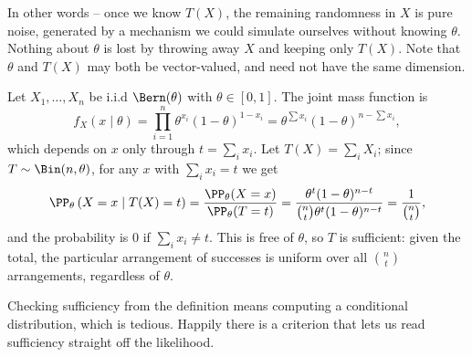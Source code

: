In other words -- once we know $T(X)$, the remaining randomness in $X$ is pure noise, generated by a mechanism we could simulate ourselves without knowing $\theta$. Nothing about $\theta$ is lost by throwing away $X$ and keeping only $T(X)$. Note that $\theta$ and $T(X)$ may both be vector-valued, and need not have the same dimension.

\begin{example}
  Let $X_1, \dots, X_n$ be i.i.d $\Bern(\theta)$ with $\theta \in [0,1]$. The joint mass function is
  $$
  f_X(x \mid \theta) = \prod_{i = 1}^{n} \theta^{x_i}(1-\theta)^{1 - x_i} = \theta^{\sum x_i}(1-\theta)^{n - \sum x_i},
  $$
  which depends on $x$ only through $t = \sum_i x_i$. Let $T(X) = \sum_i X_i$; since $T \sim \Bin(n, \theta)$, for any $x$ with $\sum_i x_i = t$ we get
  $$
  \PP_\theta\left(X = x \mid T(X) = t\right) = \frac{\PP_\theta(X = x)}{\PP_\theta(T = t)} = \frac{\theta^{t}(1-\theta)^{n - t}}{\binom{n}{t}\theta^t(1-\theta)^{n-t}} = \frac{1}{\binom{n}{t}},
  $$
  and the probability is $0$ if $\sum_i x_i \neq t$. This is free of $\theta$, so $T$ is sufficient: given the total, the particular arrangement of successes is uniform over all $\binom{n}{t}$ arrangements, regardless of $\theta$.
\end{example}

Checking sufficiency from the definition means computing a conditional distribution, which is tedious. Happily there is a criterion that lets us read sufficiency straight off the likelihood.

